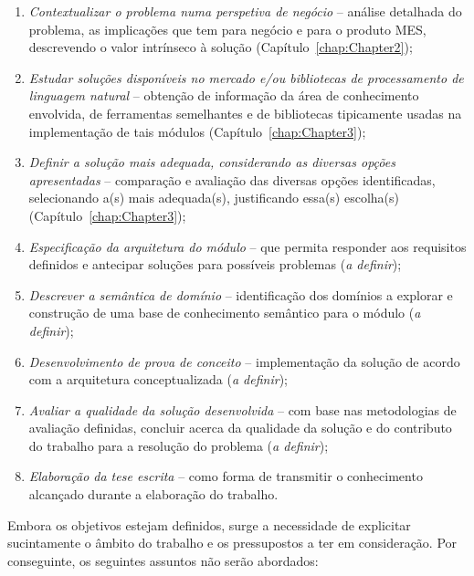 \begin{enumerate}
    \item
    \label{enum:pre1_objectives_1}
    {
        \textit{Contextualizar o problema numa perspetiva de negócio} -- análise detalhada do problema, as implicações que tem para negócio e para o produto \gls{MES}, descrevendo o valor intrínseco à solução (Capítulo~\ref{chap:Chapter2});
    }
    \item
    \label{enum:pre1_objectives_2}
    {
        \textit{Estudar soluções disponíveis no mercado e/ou bibliotecas de processamento de linguagem natural} -- obtenção de informação da área de conhecimento envolvida, de ferramentas semelhantes e de bibliotecas tipicamente usadas na implementação de tais módulos (Capítulo~\ref{chap:Chapter3});
    }
    \item
    \label{enum:pre1_objectives_3}
    {
        \textit{Definir a solução mais adequada, considerando as diversas opções apresentadas} -- comparação e avaliação das diversas opções identificadas, selecionando a(s) mais adequada(s), justificando essa(s) escolha(s) (Capítulo~\ref{chap:Chapter3});
    }
    \item
    \label{enum:pre1_objectives_4}
    {
        \textit{Especificação da arquitetura do módulo} -- que permita responder aos requisitos definidos e antecipar soluções para possíveis problemas (\textit{a definir});
    }
    \item
    \label{enum:pre1_objectives_5}
    {
        \textit{Descrever a semântica de domínio} -- identificação dos domínios a explorar e construção de uma base de conhecimento semântico para o módulo (\textit{a definir});
    }
    \item
    \label{enum:pre1_objectives_6}
    {
        \textit{Desenvolvimento de prova de conceito} -- implementação da solução de acordo com a arquitetura conceptualizada (\textit{a definir});
    }
    \item
    \label{enum:pre1_objectives_7}
    {
        \textit{Avaliar a qualidade da solução desenvolvida} -- com base nas metodologias de avaliação definidas, concluir acerca da qualidade da solução e do contributo do trabalho para a resolução do problema (\textit{a definir});
    }
    \item
    \label{enum:pre1_objectives_8}
    {
        \textit{Elaboração da tese escrita} -- como forma de transmitir o conhecimento alcançado durante a elaboração do trabalho.
    }
\end{enumerate}

Embora os objetivos estejam definidos, surge a necessidade de explicitar sucintamente o âmbito do trabalho e os pressupostos a ter em consideração. Por conseguinte, os seguintes assuntos não serão abordados:

